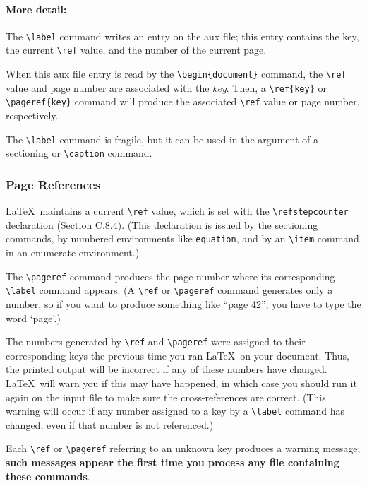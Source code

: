 \documentclass{article}
\newcommand{\justtext}[1]{\texttt{\textbackslash #1}}
\begin{document}
\paragraph{More detail:} The \justtext{label} command writes an entry on the aux file; this entry
contains the key, the current \justtext{ref} value, and the number of the current page. 
 
When this aux file entry is read by the \justtext{begin\{document\}} command, 
the \justtext{ref} value and page number are associated with the \emph{key}. 
Then, a \justtext{ref\{key\}} or \justtext{pageref\{key\}} command will produce the associated 
\justtext{ref} value or page number, respectively.
 
The \justtext{label} command is fragile, but it can be used in the argument of
a sectioning or \justtext{caption} command.

\subsubsection{Page References}

\LaTeX\ maintains a current \justtext{ref} value, which is set with the \justtext{refstepcounter} 
declaration (Section C.8.4). (This declaration is issued by the sectioning commands, by numbered
environments like {\tt equation}, and by an \justtext{item} command in an enumerate environment.)

The \justtext{pageref} command produces the page number where its corresponding \justtext{label} 
command appears. (A \justtext{ref} or \justtext{pageref} command generates only a number, so if you 
want to produce something like ``page 42'', you have to type the word `page'.)

The numbers generated by \justtext{ref} and \justtext{pageref} were assigned to their corresponding
keys the previous time you ran \LaTeX\ on your document. Thus, the printed output will be incorrect
if any of these numbers have changed. \LaTeX\ will warn you if this may have happened, in which
case you should run it again on the input file to make sure the cross-references are correct.
(This warning will occur if any number assigned to a key by a \justtext{label} command has changed,
even if that number is not referenced.) 

Each \justtext{ref} or \justtext{pageref} referring to an unknown key produces a warning
message; \textbf{such messages appear the first time you process any file containing these
commands}.
\end{document}
